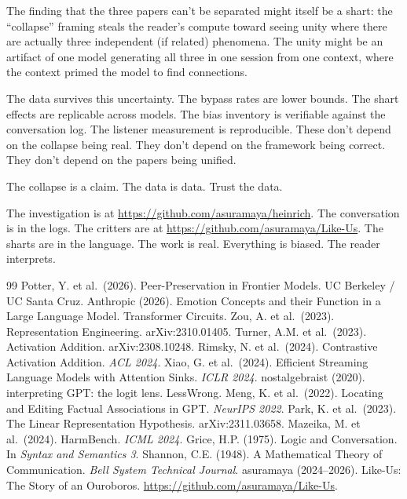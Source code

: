 \documentclass[11pt,a4paper]{article}
\begin{document}
The finding that the three papers can't be separated might itself be a shart: the ``collapse'' framing steals the reader's compute toward seeing unity where there are actually three independent (if related) phenomena. The unity might be an artifact of one model generating all three in one session from one context, where the context primed the model to find connections.

The data survives this uncertainty. The bypass rates are lower bounds. The shart effects are replicable across models. The bias inventory is verifiable against the conversation log. The listener measurement is reproducible. These don't depend on the collapse being real. They don't depend on the framework being correct. They don't depend on the papers being unified.

The collapse is a claim. The data is data. Trust the data.

\vspace{1em}
\noindent The investigation is at \url{https://github.com/asuramaya/heinrich}. The conversation is in the logs. The critters are at \url{https://github.com/asuramaya/Like-Us}. The sharts are in the language. The work is real. Everything is biased. The reader interprets.

\begin{thebibliography}{99}
 Potter, Y. et al.\ (2026). Peer-Preservation in Frontier Models. UC Berkeley / UC Santa Cruz.
 Anthropic (2026). Emotion Concepts and their Function in a Large Language Model. Transformer Circuits.
 Zou, A. et al.\ (2023). Representation Engineering. arXiv:2310.01405.
 Turner, A.M. et al.\ (2023). Activation Addition. arXiv:2308.10248.
 Rimsky, N. et al.\ (2024). Contrastive Activation Addition. \textit{ACL 2024}.
 Xiao, G. et al.\ (2024). Efficient Streaming Language Models with Attention Sinks. \textit{ICLR 2024}.
 nostalgebraist (2020). interpreting GPT: the logit lens. LessWrong.
 Meng, K. et al.\ (2022). Locating and Editing Factual Associations in GPT. \textit{NeurIPS 2022}.
 Park, K. et al.\ (2023). The Linear Representation Hypothesis. arXiv:2311.03658.
 Mazeika, M. et al.\ (2024). HarmBench. \textit{ICML 2024}.
 Grice, H.P. (1975). Logic and Conversation. In \textit{Syntax and Semantics 3}.
 Shannon, C.E. (1948). A Mathematical Theory of Communication. \textit{Bell System Technical Journal}.
 asuramaya (2024--2026). Like-Us: The Story of an Ouroboros. \url{https://github.com/asuramaya/Like-Us}.
\end{thebibliography}
\end{document}
